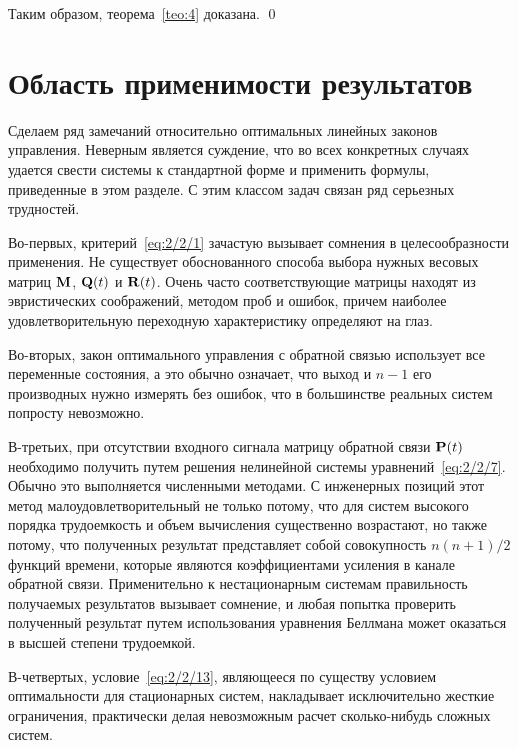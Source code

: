 Таким образом, теорема~\vref{teo:4} доказана. \qed



\section{Область применимости результатов}



Сделаем ряд замечаний относительно оптимальных линейных законов управления. Неверным является суждение, что во всех конкретных случаях удается свести системы к стандартной форме и применить формулы, приведенные в этом разделе. С этим классом задач связан ряд серьезных трудностей.

Во-первых, критерий~\vref{eq:2/2/1} зачастую вызывает сомнения в целесообразности применения. Не существует обоснованного способа выбора нужных весовых матриц $\mathbf{M}$, $\mathbf{Q}(t)$ и $\mathbf{R}(t)$. Очень часто соответствующие матрицы находят из эвристических соображений, методом проб и ошибок, причем наиболее удовлетворительную переходную характеристику определяют на глаз.

Во-вторых, закон оптимального управления с обратной связью использует все переменные состояния, а это обычно означает, что выход и $n-1$ его производных нужно измерять без ошибок, что в большинстве реальных систем попросту невозможно.

В-третьих, при отсутствии входного сигнала матрицу обратной связи $\mathbf{P}(t)$ необходимо получить путем решения нелинейной системы уравнений~\vref{eq:2/2/7}. Обычно это выполняется численными методами. С инженерных позиций этот метод малоудовлетворительный не только потому, что для систем высокого порядка трудоемкость и объем вычисления существенно возрастают, но также потому, что полученных результат представляет собой совокупность $n(n+1)/2$ функций времени, которые являются коэффициентами усиления в канале обратной связи. Применительно к нестационарным системам правильность получаемых результатов вызывает сомнение, и любая попытка проверить полученный результат путем использования уравнения Беллмана может оказаться в высшей степени трудоемкой.

В-четвертых, условие~\vref{eq:2/2/13}, являющееся по существу условием оптимальности для стационарных систем, накладывает исключительно жесткие ограничения, практически делая невозможным расчет сколько-нибудь сложных систем.
